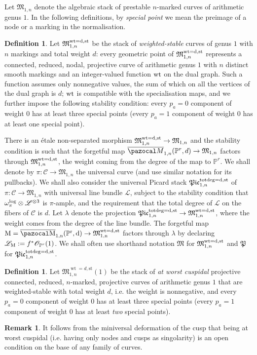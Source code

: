 \documentclass[11pt]{amsart}
\newcommand{\M}[4]{\overline{\pazocal M}_{#1,#2}(#3,#4)}
\newcommand{\PP}{\mathbb P}
\newcommand{\OO}{\mathcal O}
\renewcommand{\to}{\rightarrow}
\newcommand{\cC}{\mathcal C}
\newcommand{\MM}{\mathfrak M}
\newcommand{\PtoM}{\lambda}
\theoremstyle{plain}
\theoremstyle{definition}
\newtheorem{dfn}[thm]{Definition}
\newtheorem{remark}[thm]{Remark}
\begin{document}
Let $\MM_{1,n}$ denote the algebraic stack of prestable $n$-marked curves of arithmetic genus $1$. In the following definitions, by \emph{special point} we mean the preimage of a node or a marking in the normalisation.
\begin{dfn}
Let $\mathfrak M_{1,n}^{\rm{wt}=d,\rm{st}}$ be the stack of \emph{weighted-stable} curves of genus $1$ with $n$ markings and total weight $d$: every geometric point of $\mathfrak M_{1,n}^{\rm{wt}=d,\rm{st}}$ represents a connected, reduced, nodal, projective curve of arithmetic genus $1$ with $n$ distinct smooth markings and an integer-valued function $\rm{wt}$ on the dual graph. Such a function assumes only nonnegative values, the sum of which on all the vertices of the dual graph is $d$; $\rm{wt}$ is compatible with the specialisation maps, and we further impose the following stability condition: every $p_a=0$ component of weight $0$ has at least three special points (every $p_a=1$ component of weight $0$ has at least one special point).
\end{dfn}
There is an \'{e}tale non-separated morphism $\mathfrak M_{1,n}^{\rm{wt}=d,\rm{st}}\to\mathfrak M_{1,n}$ and the stability condition is such that the forgetful map $\M{1}{n}{\PP^r}{d}\to\mathfrak M_{1,n}$ factors through $\mathfrak M_{1,n}^{\rm{wt}=d,\rm{st}}$, the weight coming from the degree of the map to $\PP^r$.
We shall denote by $\pi\colon \cC\to \MM_{1,n}$ the universal curve (and use similar notation for its pullbacks). We shall also consider the universal Picard stack $\mathfrak{Pic}^{\rm{tot deg}=d,\rm{st}}_{1,n}$ of $\pi\colon \cC\to \MM_{1,n}$ with universal line bundle $\mathcal{L}$, subject to the stability condition that $\omega_\pi^{\rm{log}}\otimes\mathcal L^{\otimes 3}$ is $\pi$-ample, and the requirement that the total degree of $\mathcal L$ on the fibers of $\cC$ is $d$. Let $\PtoM$ denote the projection $\mathfrak{Pic}^{\rm{tot deg}=d,\rm{st}}_{1,n}\to \mathfrak M_{1,n}^{\rm{wt}=d,\rm{st}}$, where the weight comes from the degree of the line bundle. The forgetful map $\rm M=\M{1}{n}{\PP^r}{d}\to\mathfrak M_{1,n}^{\rm{wt}=d,\rm{st}}$ factors through $\PtoM$ by declaring $\mathcal L_{\rm M}:=f^*\OO_{\PP^r}(1)$. We shall often use shorthand notation $\MM$ for $\mathfrak M_{1,n}^{\rm{wt}=d,\rm{st}}$ and $\mathfrak P$ for $\mathfrak{Pic}^{\rm{tot deg}=d,\rm{st}}_{1,n}$.

\begin{dfn}
Let $\mathfrak M_{1,n}^{\operatorname{wt}=d,\text{st}}(1)$ be the stack of \emph{at worst cuspidal} projective connected, reduced, $n$-marked, projective curves of arithmetic genus $1$ that are weighted-stable with total weight $d$, i.e. the weight is nonnegative, and every $p_a=0$ component of weight $0$ has at least three special points (every $p_a=1$ component of weight $0$ has at least \emph{two} special points).
\end{dfn}
\begin{remark}
 It follows from the miniversal deformation of the cusp that being at worst cuspidal (i.e. having only nodes and cusps as singolarity) is an open condition on the base of any family of curves.
\end{remark}
\end{document}
